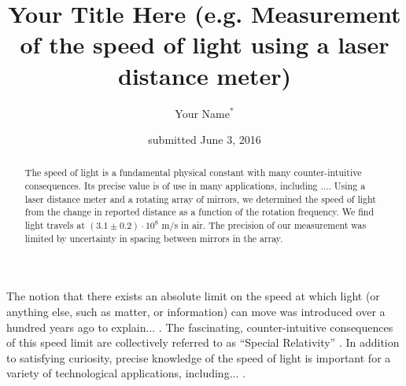 \documentclass[aps,twocolumn,showpacs,preprintnumbers]{revtex4}
\begin{document}
\title{Your Title Here (e.g. Measurement of the speed of light using a laser distance meter)}

\author{Your Name$^\ast$}


\date{submitted June 3, 2016}

\begin{abstract}  

The speed of light is a fundamental physical constant with many counter-intuitive consequences. 
Its precise value is of use in many applications, including $\ldots$. 
Using a laser distance meter and a rotating array of mirrors, we determined the speed of light from the change in reported distance as a function of the rotation frequency. 
We find light travels at $(3.1 \pm 0.2) \cdot 10^8$ m/s in air. 
The precision of our measurement was limited by uncertainty in spacing between mirrors in the array. 

\end{abstract}


\maketitle 


The notion that there exists an absolute limit on the speed at which light (or anything else, such as matter, or information) can move was introduced over a hundred years ago to explain...  \cite{EinsteinPHYSREV1905/7}. 
The fascinating, counter-intuitive consequences of this speed limit are collectively referred to as ``Special Relativity'' \cite{TaylorWheeler92}. 
In addition to satisfying curiosity, precise knowledge of the speed of light is important for a variety of technological applications, including... \cite{severalApllicationRefs}. 

\end{document}
